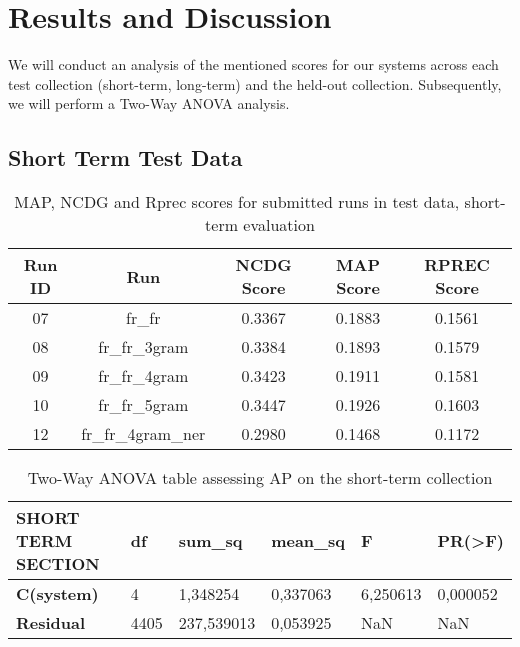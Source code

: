 \newpage
\section{Results and Discussion}
\label{sec:results}

We will conduct an analysis of the mentioned scores for our systems across each test collection (short-term, long-term)
and the held-out collection.
Subsequently, we will perform a Two-Way ANOVA analysis.\\

\subsection{Short Term Test Data}\label{subsec:short_term}

\begin{table}[h!]
    \begin{center}
        \caption{MAP, NCDG and Rprec scores for submitted runs in test data, short-term evaluation}
        \label{tab:st_scores}
        \begin{tabular}{|c|c||c|c|c|}
            \hline
            \textbf{Run ID} & \textbf{Run} & \textbf{NCDG Score} & \textbf{MAP Score} & \textbf{RPREC Score}\\
            \hline\hline
            07 & fr\_fr & 0.3367 & 0.1883 & 0.1561 \\
            \hline
            08 & fr\_fr\_3gram & 0.3384 & 0.1893 & 0.1579 \\
            \hline
            09 & fr\_fr\_4gram & 0.3423 & 0.1911 & 0.1581 \\
            \hline
            10 & fr\_fr\_5gram & 0.3447 & 0.1926 & 0.1603 \\
            \hline
            12 & fr\_fr\_4gram\_ner & 0.2980 & 0.1468 & 0.1172 \\
            \hline
        \end{tabular}
    \end{center}
\end{table}

\begin{table}[h!]
    \centering
    \caption{Two-Way ANOVA table assessing AP on the short-term collection}
    \label{tab:st_anova}
    \begin{tabular}{|l|l|l|l|l|l|}
    \hline
        \textbf{SHORT TERM SECTION} & \textbf{df} & \textbf{sum\_sq} & \textbf{mean\_sq} & \textbf{F} & \textbf{PR(>F)} \\ \hline\hline
        \textbf{C(system)} & 4 & 1,348254 & 0,337063 & 6,250613 & 0,000052 \\ \hline
        \textbf{Residual} & 4405 & 237,539013 & 0,053925 & NaN & NaN \\ \hline
    \end{tabular}
\end{table}

